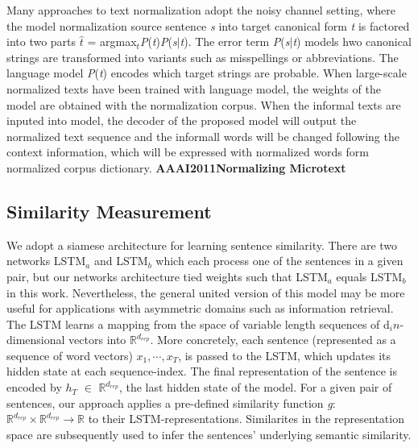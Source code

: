 \documentclass[letterpaper]{article}
\begin{document}
Many approaches to text normalization adopt the noisy channel setting, where the model normalization source sentence \textit{s} into target canonical form \textit{t} is factored into two parts $\hat{t}$ = argmax$_{t}$\textit{P}(\textit{t})\textit{P}(\textit{s}$\vert$\textit{t}). The error term \textit{P}(\textit{s}$\vert$\textit{t}) models hwo canonical strings are transformed into variants such as misspellings or abbreviations. The language model \textit{P}(\textit{t}) encodes which target strings are probable. When large-scale normalized texts have been trained with language model, the weights of the model are obtained with the normalization corpus. When the informal texts are inputed into model, the decoder of the proposed model will output the normalized text sequence and the informall words will be changed following the context information, which will be expressed with normalized words form normalized corpus dictionary. \textbf{AAAI2011Normalizing Microtext}

\subsection{Similarity Measurement}
We adopt a siamese architecture for learning sentence similarity. There are two networks LSTM$_a$ and LSTM$_b$ which each process one of the sentences in a given pair, but our networks architecture tied weights such that LSTM$_a$ equals LSTM$_b$ in this work. Nevertheless, the general united version of this model may be more useful for applications with asymmetric domains such as information retrieval. The LSTM learns a mapping from the space of variable length sequences of d$_in$-dimensional vectors into $\mathbb{R}^{d_{rep}}$. More concretely, each sentence (represented as a sequence of word vectors) \textit{$x_{1},\cdots,x_{T}$}, is passed to the LSTM, which updates its hidden state at each sequence-index. The final representation of the sentence is encoded by \textit{$h_{T}$} $\in$ $\mathbb{R}^{d_{rep}}$, 
the last hidden state of the model. For a given pair of sentences, our approach applies a pre-defined similarity function \textit{g}: $\mathbb{R}^{d_{rep}}\times\mathbb{R}^{d_{rep}}\rightarrow\mathbb{R}$ to their LSTM-representations. Similarites in the representation space are subsequently used to infer the sentences' underlying semantic similarity.
\end{document}
